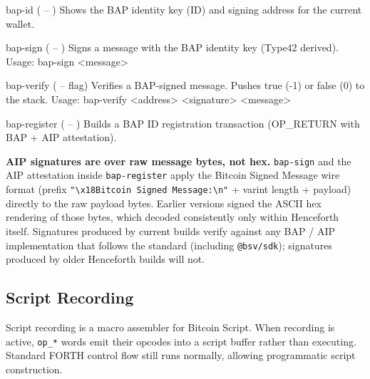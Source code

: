 \documentclass[a4paper, 11pt, openany]{book}
\begin{document}
\begin{forthbox}
  bap-id       ( -- )
               Shows the BAP identity key (ID) and signing address
               for the current wallet.

  bap-sign     ( -- )
               Signs a message with the BAP identity key (Type42
               derived). Usage: bap-sign <message>

  bap-verify   ( -- flag)
               Verifies a BAP-signed message. Pushes true (-1) or
               false (0) to the stack.
               Usage: bap-verify <address> <signature> <message>

  bap-register ( -- )
               Builds a BAP ID registration transaction
               (OP_RETURN with BAP + AIP attestation).
\end{forthbox}

\begin{notebox}
\textbf{AIP signatures are over raw message bytes, not hex.} \texttt{bap-sign} and the AIP attestation inside \texttt{bap-register} apply the Bitcoin Signed Message wire format (prefix \texttt{"\textbackslash x18Bitcoin Signed Message:\textbackslash n"} + varint length + payload) directly to the raw payload bytes. Earlier versions signed the ASCII hex rendering of those bytes, which decoded consistently only within Henceforth itself. Signatures produced by current builds verify against any BAP / AIP implementation that follows the standard (including \texttt{@bsv/sdk}); signatures produced by older Henceforth builds will not.
\end{notebox}

\subsection{Script Recording}

Script recording is a macro assembler for Bitcoin Script. When recording is active, \texttt{op\_*} words emit their opcodes into a script buffer rather than executing. Standard FORTH control flow still runs normally, allowing programmatic script construction.
\end{document}
